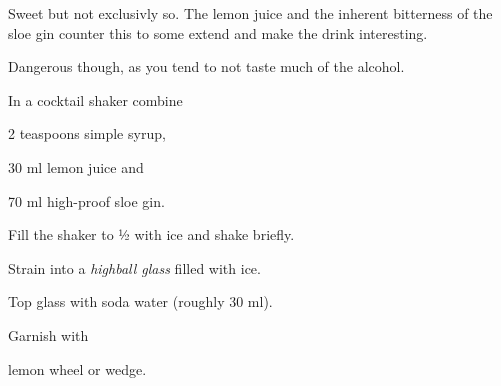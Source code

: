 \startsection[title={Sloe Gin Fizz},reference=sloeginfizz]
Sweet but not exclusivly so. The lemon juice and the inherent bitterness
of the sloe gin counter this to some extend and make the drink interesting.

Dangerous though, as you tend to not taste much of the alcohol.

\startitemize
\item In a cocktail shaker combine
      \startitemize
      \item 2 teaspoons simple syrup,
      \item 30 ml lemon juice and
      \item 70 ml high-proof sloe gin.
      \stopitemize
\item Fill the shaker to ½ with ice and shake briefly.
\item Strain into a {\em highball glass} filled with ice.
\item Top glass with soda water (roughly 30 ml).
\item Garnish with
      \startitemize
      \item lemon wheel or wedge.
      \stopitemize
\stopitemize
